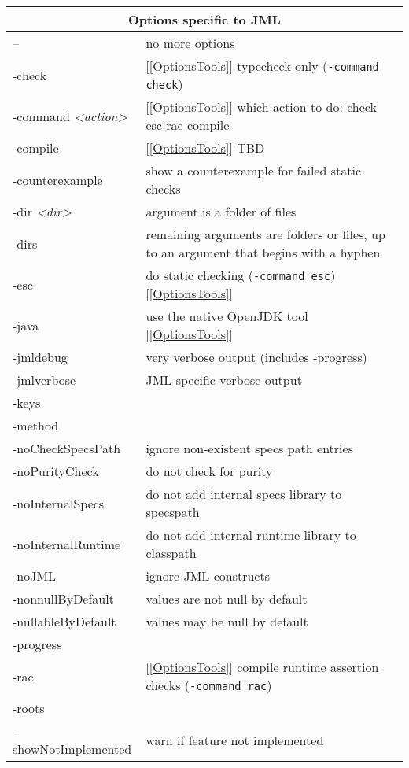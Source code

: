 \documentclass{report}%
\begin{document}
\begin{table} \small
\parbox{.5\textwidth}{
\begin{tabular}{|l|p{1.4in}|}
\hline
\multicolumn{2}{|c|}{Options specific to JML} \\
\hline
-- & no more options \\ \hline
-check & [\ref{OptionsTools}] typecheck only ({\tt -command check})\\ \hline
-command {\it <action>}& [\ref{OptionsTools}] which action to do: check esc rac compile\\ \hline
-compile & [\ref{OptionsTools}] TBD\\ \hline
-counterexample & show a counterexample for failed static checks\\ \hline
-dir {\it <dir>} & argument is a folder of files \\ \hline
-dirs & remaining arguments are folders or files, up to an argument that begins with a hyphen\\ \hline
-esc & do static checking ({\tt -command esc}) [\ref{OptionsTools}]\\ \hline
-java & use the native OpenJDK tool [\ref{OptionsTools}]\\ \hline
-jmldebug & very verbose output (includes -progress) \\ \hline
-jmlverbose & JML-specific verbose output\\ \hline
-keys & \\ \hline
-method & \\ \hline
-noCheckSpecsPath & ignore non-existent specs path entries\\ \hline
-noPurityCheck & do not check for purity \\ \hline
-noInternalSpecs & do not add internal specs library to specspath \\ \hline
-noInternalRuntime & do not add internal runtime library to classpath \\ \hline
-noJML & ignore JML constructs \\ \hline
-nonnullByDefault & values are not null by default \\ \hline
-nullableByDefault & values may be null by default\\ \hline
-progress & \\ \hline
-rac & [\ref{OptionsTools}] compile runtime assertion checks ({\tt -command rac})\\ \hline
-roots & \\ \hline
-showNotImplemented & warn if feature not implemented\\ \hline

\end{tabular}}
\end{table}
\end{document}
